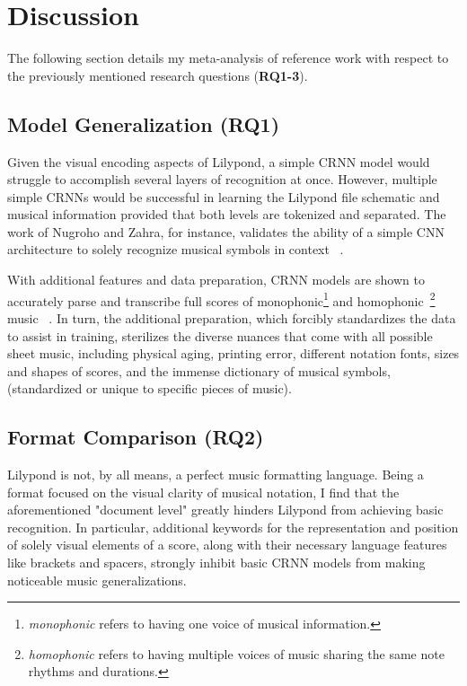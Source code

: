 \documentclass[nonacm, sigconf]{acmart}
\begin{document}
\section{Discussion}

The following section details my meta-analysis of reference work with respect to the previously mentioned research questions (\textbf{RQ1-3}).

\subsection{Model Generalization (RQ1)}
Given the visual encoding aspects of Lilypond, a simple CRNN model would struggle to accomplish several layers of recognition at once.
However, multiple simple CRNNs would be successful in learning the Lilypond file schematic and musical information provided that both levels are tokenized and separated.
The work of Nugroho and Zahra, for instance, validates the ability of a simple CNN architecture to solely recognize musical symbols in context ~\cite{nugroho_zahra_2024}.

With additional features and data preparation, CRNN models are shown to accurately parse and transcribe full scores of monophonic\footnote{\textit{monophonic} refers to having one voice of musical information.} and homophonic~\footnote{\textit{homophonic} refers to having multiple voices of music sharing the same note rhythms and durations.} music ~\cite{contreras2023omrcnn}.
In turn, the additional preparation, which forcibly standardizes the data to assist in training, sterilizes the diverse nuances that come with all possible sheet music, 
including physical aging, printing error, different notation fonts, sizes and shapes of scores, and the immense dictionary of musical symbols, (standardized or unique to specific pieces of music).

\subsection{Format Comparison (RQ2)}
Lilypond is not, by all means, a perfect music formatting language. 
Being a format focused on the visual clarity of musical notation, I find that the aforementioned "document level" greatly hinders Lilypond from achieving basic recognition.
In particular, additional keywords for the representation and position of solely visual elements of a score, 
along with their necessary language features like brackets and spacers, strongly inhibit basic CRNN models from making noticeable music generalizations.
\end{document}
